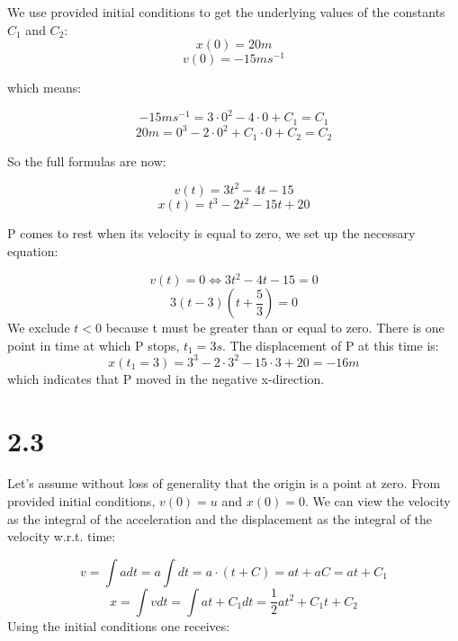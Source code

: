 \documentclass{article}
\begin{document}
We use provided initial conditions to get the underlying values of the constants \(C_1\) and \(C_2\):
\begin{equation*}
    x(0) = 20m
\end{equation*}
\begin{equation*}
    v(0) = -15ms^{-1}
\end{equation*}

which means:

\begin{equation*}
    -15ms^{-1} = 3\cdot0^{2} - 4 \cdot 0 + C_1 = C_1
\end{equation*}
\begin{equation*}
    20m = 0^{3} - 2 \cdot 0^{2} + C_{1} \cdot 0 + C_2 = C_2 
\end{equation*}

So the full formulas are now:

\begin{equation*}
    v(t) = 3t^{2} -4t - 15
\end{equation*}
\begin{equation*}
    x(t) = t^{3} - 2t^{2} -15t + 20
\end{equation*}

P comes to rest when its velocity is equal to zero, we set up the necessary equation:

\begin{equation*}
    v(t) = 0 \iff 3t^{2} -4t - 15 = 0
\end{equation*}
\begin{equation*}
    3(t-3)(t + \frac{5}{3}) = 0
\end{equation*}
We exclude \(t < 0\) because t must be greater than or equal to zero.
There is one point in time at which P stops, \(t_1 = 3s\). The displacement
of P at this time is:
\begin{equation*}
    x(t_1=3) = 3^{3} - 2 \cdot 3^{2} -15 \cdot 3 + 20 = -16m
\end{equation*}
which indicates that P moved in the negative x-direction.

\section*{2.3}
Let's assume without loss of generality that the origin is a point at zero.
From provided initial conditions, \(v(0) = u\) and \(x(0) = 0\).
We can view the velocity
as the integral of the acceleration and the displacement as the integral of the velocity w.r.t. time:

\begin{equation*}
    v = \int a dt = a \int dt = a \cdot (t + C) = at + aC = at + C_{1}
\end{equation*}
\begin{equation*}
    x = \int v dt = \int at + C_1 dt = \frac{1}{2}at^{2} + C_{1}t + C_{2}
\end{equation*}
Using the initial conditions one receives:
\end{document}
